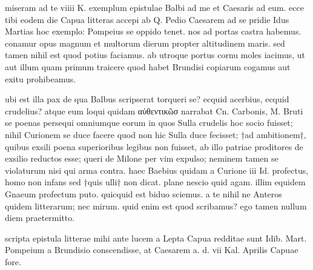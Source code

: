 


 miseram ad te viiii K. exemplum epistulae Balbi ad me et Caesaris ad eum. ecce tibi eodem die Capua litteras accepi ab Q. Pedio Caesarem ad se pridie Idus Martias hoc exemplo: Pompeius se oppido tenet. nos ad portas castra habemus. conamur opus magnum et multorum dierum propter altitudinem maris. sed tamen nihil est quod potius faciamus. ab utroque portus cornu moles iacimus, ut aut illum quam primum traicere quod habet Brundisi copiarum cogamus aut exitu prohibeamus.

 ubi est illa pax de qua Balbus scripserat torqueri se? ecquid acerbius, ecquid crudelius? atque eum loqui quidam αὐθεντικῶσ narrabat Cn. Carbonis, M. Bruti se poenas persequi omniumque eorum in quos Sulla crudelis hoc socio fuisset; nihil Curionem se duce facere quod non hic Sulla duce fecisset; †ad ambitionem†, quibus exsili poena superioribus legibus non fuisset, ab illo patriae proditores de exsilio reductos esse; queri de Milone per vim expulso; neminem tamen se violaturum nisi qui arma contra. haec Baebius quidam a Curione iii Id. profectus, homo non infans sed †quis ulli† non dicat. plane nescio quid agam. illim equidem Gnaeum profectum puto. quicquid est biduo sciemus. a te nihil ne Anteros quidem litterarum; nec mirum. quid enim est quod scribamus? ego tamen nullum diem praetermitto.

 scripta epistula litterae mihi ante lucem a Lepta Capua redditae sunt Idib. Mart. Pompeium a Brundisio conscendisse, at Caesarem a. d. vii Kal. Aprilis Capuae fore.
